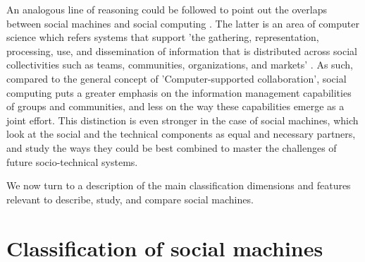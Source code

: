 \documentclass{sig-alternate}
\begin{document}
An analogous line of reasoning could be followed to point out the overlaps between social machines and social computing \cite{parameswaran2007research}. The latter is an area of computer science which refers systems that support 'the gathering, representation, processing, use, and dissemination of information that is distributed across social collectivities such as teams, communities, organizations, and markets' \cite{parameswaran2007research}. As such, compared to the general concept of 'Computer-supported collaboration', social computing puts a greater emphasis on the information management capabilities of groups and communities, and less on the way these capabilities emerge as a joint effort. This distinction is even stronger in the case of social machines, which look at the social and the technical components as equal and necessary partners, and study the ways they could be best combined to master the challenges of future socio-technical systems.

We now turn to a description of the main classification dimensions and features relevant to describe, study, and compare social machines.

\section{Classification of social machines}
\label{sec:framework}
\end{document}
